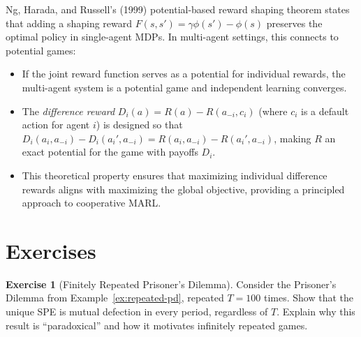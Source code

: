\documentclass[11pt,a4paper]{article}
\theoremstyle{definition}
\newtheorem{exercise}{Exercise}[section]
\theoremstyle{plain}
\theoremstyle{remark}
\begin{document}
\begin{rlconnection}
Ng, Harada, and Russell's (1999) potential-based reward shaping theorem states that
adding a shaping reward $F(s, s') = \gamma \phi(s') - \phi(s)$ preserves the optimal
policy in single-agent MDPs. In multi-agent settings, this connects to potential games:
\begin{itemize}
    \item If the joint reward function serves as a potential for individual rewards,
    the multi-agent system is a potential game and independent learning converges.
    \item The \emph{difference reward} $D_i(a) = R(a) - R(a_{-i}, c_i)$ (where $c_i$ is a
    default action for agent $i$) is designed so that $D_i(a_i, a_{-i}) - D_i(a_i', a_{-i})
    = R(a_i, a_{-i}) - R(a_i', a_{-i})$, making $R$ an exact potential for the game with
    payoffs $D_i$.
    \item This theoretical property ensures that maximizing individual difference rewards
    aligns with maximizing the global objective, providing a principled approach to
    cooperative MARL.
\end{itemize}
\end{rlconnection}


\section{Exercises}
\label{sec:exercises}

\begin{exercise}[Finitely Repeated Prisoner's Dilemma]
\label{ex:finite-pd}
Consider the Prisoner's Dilemma from Example~\ref{ex:repeated-pd}, repeated $T = 100$
times. Show that the unique SPE is mutual defection in every period, regardless of $T$.
Explain why this result is ``paradoxical'' and how it motivates infinitely repeated games.
\end{exercise}
\end{document}

